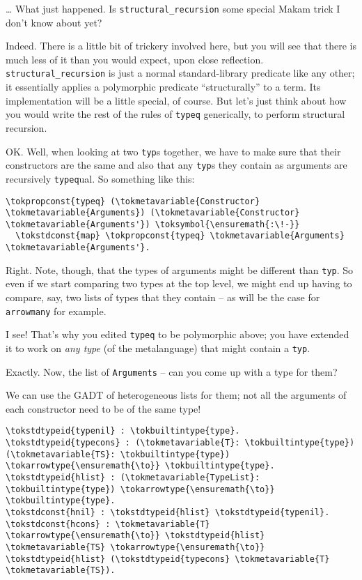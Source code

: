 \importantCodeblockEnd{}

\heroSTUDENT{} \ldots{} What just happened. Is \texttt{structural\_recursion}
some special Makam trick I don't know about yet?

\heroADVISOR{} Indeed. There is a little bit of trickery involved here, but
you will see that there is much less of it than you would expect, upon
close reflection. \texttt{structural\_recursion} is just a normal
standard-library predicate like any other; it essentially applies a
polymorphic predicate ``structurally'' to a term. Its implementation
will be a little special, of course. But let's just think about how you
would write the rest of the rules of \texttt{typeq} generically, to
perform structural recursion.

\heroSTUDENT{} OK. Well, when looking at two \texttt{typ}s together, we have
to make sure that their constructors are the same and also that any
\texttt{typ}s they contain as arguments are recursively
\texttt{typeq}ual. So something like this:

\begin{verbatim}
\tokpropconst{typeq} (\tokmetavariable{Constructor} \tokmetavariable{Arguments}) (\tokmetavariable{Constructor} \tokmetavariable{Arguments'}) \toksymbol{\ensuremath{:\!-}}
  \tokstdconst{map} \tokpropconst{typeq} \tokmetavariable{Arguments} \tokmetavariable{Arguments'}.
\end{verbatim}

\heroADVISOR{} Right. Note, though, that the types of arguments might be
different than \texttt{typ}. So even if we start comparing two types at
the top level, we might end up having to compare, say, two lists of
types that they contain -- as will be the case for \texttt{arrowmany}
for example.

\heroSTUDENT{} I see! That's why you edited \texttt{typeq} to be polymorphic
above; you have extended it to work on \emph{any type} (of the
metalanguage) that might contain a \texttt{typ}.

\heroADVISOR{} Exactly. Now, the list of \texttt{Arguments} -- can you come up
with a type for them?

\heroSTUDENT{} We can use the GADT of heterogeneous lists for them; not all
the arguments of each constructor need to be of the same type!

\begin{verbatim}
\tokstdtypeid{typenil} : \tokbuiltintype{type}. \tokstdtypeid{typecons} : (\tokmetavariable{T}: \tokbuiltintype{type}) (\tokmetavariable{TS}: \tokbuiltintype{type}) \tokarrowtype{\ensuremath{\to}} \tokbuiltintype{type}.
\tokstdtypeid{hlist} : (\tokmetavariable{TypeList}: \tokbuiltintype{type}) \tokarrowtype{\ensuremath{\to}} \tokbuiltintype{type}.
\tokstdconst{hnil} : \tokstdtypeid{hlist} \tokstdtypeid{typenil}. \tokstdconst{hcons} : \tokmetavariable{T} \tokarrowtype{\ensuremath{\to}} \tokstdtypeid{hlist} \tokmetavariable{TS} \tokarrowtype{\ensuremath{\to}} \tokstdtypeid{hlist} (\tokstdtypeid{typecons} \tokmetavariable{T} \tokmetavariable{TS}).
\end{verbatim}


